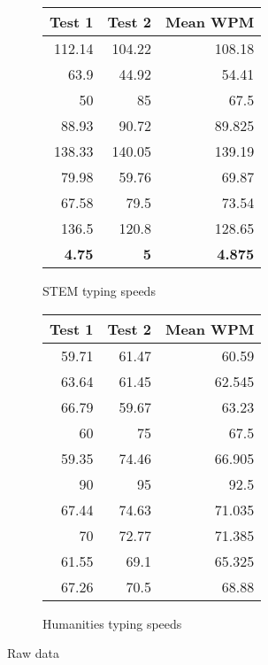 \documentclass{article}
\begin{document}
\begin{figure}[H]
    \begin{subfigure}[t]{0.5\textwidth}
        \centering
        \begin{tabular}[t]{rrr}
            \toprule
            Test 1 & Test 2 & Mean WPM \\
            \midrule
            112.14 & 104.22 & 108.18 \\
            63.9 & 44.92 & 54.41 \\
            50 & 85 & 67.5 \\
            88.93 & 90.72 & 89.825 \\
            138.33 & 140.05 & 139.19 \\
            79.98 & 59.76 & 69.87 \\
            67.58 & 79.5 & 73.54 \\
            136.5 & 120.8 & 128.65 \\
            \bf{4.75} & \bf{5} & \bf{4.875}
        \end{tabular}
        \caption{STEM typing speeds}
        \label{raw:stem}
    \end{subfigure}\hfill%
    \begin{subfigure}[t]{0.5\textwidth}
        \centering
        \begin{tabular}[t]{rrr}
            \toprule
            Test 1 & Test 2 & Mean WPM \\
            \midrule
            59.71 & 61.47 & 60.59 \\
            63.64 & 61.45 & 62.545 \\
            66.79 & 59.67 & 63.23 \\
            60 & 75 & 67.5 \\
            59.35 & 74.46 & 66.905 \\
            90 & 95 & 92.5 \\
            67.44 & 74.63 & 71.035 \\
            70 & 72.77 & 71.385 \\
            61.55 & 69.1 & 65.325 \\
            67.26 & 70.5 & 68.88
        \end{tabular}
        \caption{Humanities typing speeds}
        \label{raw:humanities}
    \end{subfigure}
    \caption{Raw data}
    \label{raw}
\end{figure}

\newpage
\end{document}
